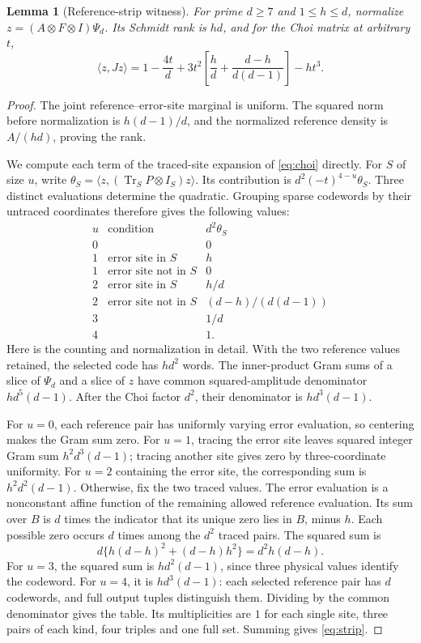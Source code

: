 \documentclass[11pt,a4paper]{article}
\newtheorem{lemma}[theorem]{Lemma}
\newcommand{\Tr}{\operatorname{Tr}}
\begin{document}
\begin{lemma}[Reference-strip witness]\label{lem:strip}
For prime \(d\ge7\) and \(1\le h\le d\), normalize
\(z=(A\otimes F\otimes I)\Psi_d\).
Its Schmidt rank is \(hd\), and for the Choi matrix at arbitrary \(t\),
\begin{equation}\label{eq:strip}
 \langle z,Jz\rangle
 =1-\frac{4t}{d}
   +3t^2\left[\frac hd+\frac{d-h}{d(d-1)}\right]-ht^3 .
\end{equation}
\end{lemma}
\begin{proof}
The joint reference--error-site marginal is uniform. The squared norm before normalization is \(h(d-1)/d\), and the normalized reference density is \(A/(hd)\), proving the rank.

We compute each term of the traced-site expansion of \eqref{eq:choi} directly. For \(S\) of size \(u\), write
\(\theta_S=\langle z,(\Tr_S P\otimes I_S)z\rangle\).
Its contribution is \(d^2(-t)^{4-u}\theta_S\).
Three distinct evaluations determine the quadratic. Grouping sparse codewords by their untraced coordinates therefore gives the following values:
\[
\begin{array}{ccl}
u&\text{condition}&d^2\theta_S\\ \hline
0&&0\\
1&\text{error site in }S&h\\
1&\text{error site not in }S&0\\
2&\text{error site in }S&h/d\\
2&\text{error site not in }S&(d-h)/(d(d-1))\\
3&&1/d\\
4&&1 .
\end{array}
\]
Here is the counting and normalization in detail. With the two reference values retained, the selected code has \(hd^2\) words. The inner-product Gram sums of a slice of \(\Psi_d\) and a slice of \(z\) have common squared-amplitude denominator \(hd^5(d-1)\). After the Choi factor \(d^2\), their denominator is \(hd^3(d-1)\).

For \(u=0\), each reference pair has uniformly varying error evaluation, so centering makes the Gram sum zero. For \(u=1\), tracing the error site leaves squared integer Gram sum \(h^2d^3(d-1)\); tracing another site gives zero by three-coordinate uniformity. For \(u=2\) containing the error site, the corresponding sum is \(h^2d^2(d-1)\). Otherwise, fix the two traced values. The error evaluation is a nonconstant affine function of the remaining allowed reference evaluation. Its sum over \(B\) is \(d\) times the indicator that its unique zero lies in \(B\), minus \(h\). Each possible zero occurs \(d\) times among the \(d^2\) traced pairs. The squared sum is
\[
 d\{h(d-h)^2+(d-h)h^2\}=d^2h(d-h).
\]
For \(u=3\), the squared sum is \(hd^2(d-1)\), since three physical values identify the codeword. For \(u=4\), it is \(hd^3(d-1)\): each selected reference pair has \(d\) codewords, and full output tuples distinguish them. Dividing by the common denominator gives the table. Its multiplicities are \(1\) for each single site, three pairs of each kind, four triples and one full set. Summing gives \eqref{eq:strip}.
\end{proof}
\end{document}
